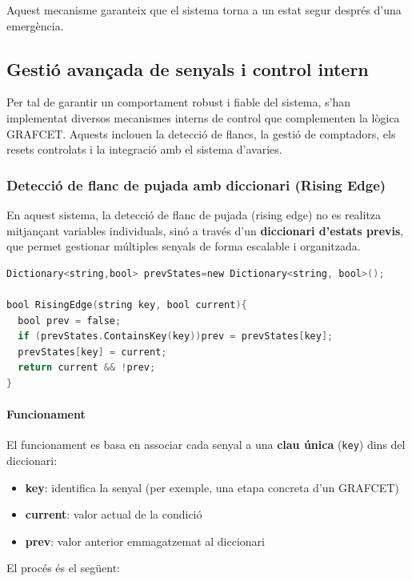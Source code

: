 \documentclass[12pt,a4paper]{report}
\begin{document}
Aquest mecanisme garanteix que el sistema torna a un estat segur després d'una emergència.

\subsection{Gestió avançada de senyals i control intern}

Per tal de garantir un comportament robust i fiable del sistema, s'han implementat diversos mecanismes interns de control que complementen la lògica GRAFCET. Aquests inclouen la detecció de flancs, la gestió de comptadors, els resets controlats i la integració amb el sistema d'avaries.

\subsubsection{Detecció de flanc de pujada amb diccionari (Rising Edge)}

En aquest sistema, la detecció de flanc de pujada (rising edge) no es realitza mitjançant variables individuals, sinó a través d'un \textbf{diccionari d'estats previs}, que permet gestionar múltiples senyals de forma escalable i organitzada.

\begin{lstlisting}[language=C]
Dictionary<string,bool> prevStates=new Dictionary<string, bool>();

bool RisingEdge(string key, bool current){
  bool prev = false;
  if (prevStates.ContainsKey(key))prev = prevStates[key];
  prevStates[key] = current;
  return current && !prev;
}
\end{lstlisting}

\paragraph{Funcionament}

El funcionament es basa en associar cada senyal a una \textbf{clau única} (\texttt{key}) dins del diccionari:

\begin{itemize}
\item \textbf{key}: identifica la senyal (per exemple, una etapa concreta d'un GRAFCET)
\item \textbf{current}: valor actual de la condició
\item \textbf{prev}: valor anterior emmagatzemat al diccionari
\end{itemize}

El procés és el següent:
\end{document}
